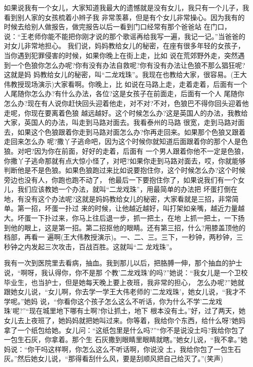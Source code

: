 \documentclass[11pt,a4paper,onecolumn]{article}
\begin{document}
如果说我有一个女儿，大家知道我最大的遗憾就是没有女儿，我只有一个儿子，我看到别人家的女孩梳着小辫子我
非常羡慕，但是有个女儿非常操心。因为我有的时候去给别人做报告，做完报告以后一看到门口经常有那个爸爸站
在门口，说：``王老师你能不能把你刚才说的那个歌谣再给我写一遍，我记一记。''当爸爸的对女儿非常地担心。
我们说，妈妈教给女儿的秘密，在座有很多年轻的女孩子，当你遇到犯罪侵害的时候，如果你晚上在街上走，比如
说在荒郊野外走，突然遇到一个色狼你怎么办呢?你有没有办法自救呢?你有没有办法让色狼不那么猖狂呢?这就是妈
妈教给女儿的秘密，叫``二龙戏珠''。我现在也教给大家，很容易。(王大伟教授现场演示)大家看啊。你晚上，比
如说在马路上走，走着走着，后面有一个人尾随你怎么办?有什么办法，各位?这是女孩子在前面走，后面有一个人
尾随你怎么办?现在有人说你赶快回头迎着他走，对不对?不对，色狼巴不得你回头迎着他走呢，你现在要离着色狼
越远越好。这个时候怎么办?这是英国人的办法，我教给大家，英国人的办法，叫走到马路对面去。我看泰州的马路
很宽，走到马路对面去，如果这个色狼跟着你走到马路对面怎么办?你再走回来。如果那个色狼又跟着走回来怎么办
呢?撒丫子逃命吧，因为这个时候你就知道后面跟着你的那个人是色狼。对吧?因为你在前面，好好的走着，后面有
一个男人跟着你他不一定是色狼，你撒丫子逃命那就有点大惊小怪了，对吧?如果你走到马路对面去，哎，你就能够
判断他是不是色狼。如果色狼跑过来比如说要抱住你，这个时候怎么办?这个时候旁边也没有人，你跑也跑不动了，
他最后一下要抱住你了，如果说我们有一个女儿，我们应该教她一个办法，就叫``二龙戏珠''，用最简单的办法把
坏蛋打倒在地，有没有这个办法呢?这就是妈妈教给女儿的秘密，大家看就是三招，非常简单。第一招，坏蛋一扑过
来的时候，让他越近越好，叫打架如亲嘴，越近力量越大。坏蛋一下扑过来，你马上往后退一步，抓一把土，在地
上抓一把土，一下扬到他的眼上，这是第一招。第二招抠他的眼睛。还有第三招，什么?用膝盖顶他的档部，再看一
遍啊(王大伟教授演示)。一、二、三。三下，一秒钟，两秒钟，三秒钟之内发起三次攻击，百战百胜。这就叫``二
龙戏珠''。

我有一次到医院里去看病，抽血。我到那儿以后，把胳膊一伸，那个抽血的护士说，``啊呀，我认得你，你不是那
个教'二龙戏珠'的吗?''她说：``我女儿是一个卫校毕业生，也当护士，但是她每天晚上要上夜班，我非常的担心，
怎么办呢?''她就跟她女儿说，``女儿啊，你去学一学王大伟老师的'二龙戏珠'，她女儿说，``我才不学呢。''她妈
说，``你看你这个孩子怎么这么不听话，你为什么不学'二龙戏珠'呢?''``现在城里地下哪有土啊?你让抓土，地下
根本没有土。''好，过了两天，她女儿去上夜班了，她妈妈就把她叫过来。你等着，我给你个东西，给什么呀?她妈
拿了一个纸包给她。女儿问：``这纸包里是什么吗?''``你不是说没土吗?我给你包了一包生石灰，你拿着。那个生
石灰撒到眼睛里眼睛就瞎。''她女儿说，``我不拿。''她妈说：``你干吗这样啊，你怎么这么不听话啊，你说没
土，我给你包了一包生石灰。''然后她女儿说，``那得看刮什么风，要是刮顺风把自己给灭了。''(笑声)
\end{document}
